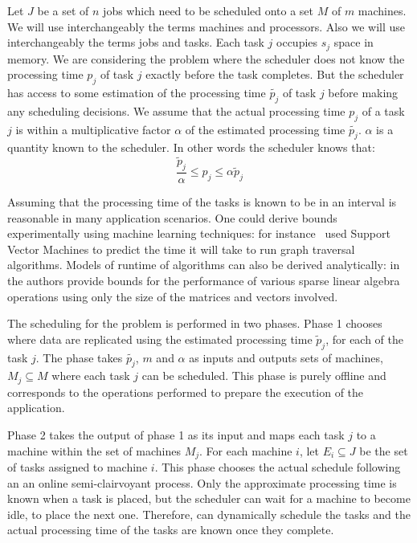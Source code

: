 \label{ch2}
\label{Intro}

 Let $J$ be a set of $n$ jobs which need to be scheduled onto a set $M$
 of $m$ machines.  We will use interchangeably the terms machines and
 processors. Also we will use interchangeably the terms jobs and
 tasks. Each task $j$ occupies $s_j$ space in memory.  We are considering the problem where the scheduler does not
 know the processing time $p_j$ of task $j$ exactly before the task
 completes.  But the scheduler has access to some estimation of the
 processing time $\tilde{p_j}$ of task $j$ before making any scheduling
 decisions. We assume that the actual processing time $p_j$ of a task
 $j$ is within a multiplicative factor $\alpha$ of the estimated
 processing time $\tilde{p_j}$. $\alpha$ is a quantity known to the
 scheduler. In other words the scheduler knows that:
  \begin{equation}\label{eq1}
 \frac{\tilde{p}_{j}}{\alpha}\leq p_{j}\leq \alpha \tilde{p}_{j}
 \end{equation}
 
 Assuming that the processing time of the tasks is known to be in an
 interval is reasonable in many application scenarios. One could derive
 bounds experimentally using machine learning techniques: for
 instance~\cite{You14-ICPP} used Support Vector Machines to predict the time it
 will take to run graph traversal algorithms. Models of runtime of
 algorithms can also be derived analytically:
 in~\cite{Erlebacher14-ICS} the authors provide bounds for the
 performance of various sparse linear algebra operations using only the
 size of the matrices and vectors involved.
 
 
 The scheduling for the problem is performed in two phases. Phase 1
 chooses where data are replicated using the estimated processing time
 $\tilde p_j $, for each of the task $j$. The phase takes
 $\tilde{p_j}$, $m$ and $\alpha$ as inputs and outputs sets of machines,
 $M_j \subseteq M $ where each task $j$ can be scheduled. This phase is
 purely offline and corresponds to the operations performed to prepare
 the execution of the application.
 
 Phase 2 takes the output of phase 1 as its input and maps each task $j$
 to a machine within the set of machines $M_j$. For each machine $i$,
 let $E_i \subseteq J$ be the set of tasks assigned to machine
 $i$. This phase chooses the actual schedule following an an online
 semi-clairvoyant process. Only the approximate processing time is
 known when a task is placed, but the scheduler can wait for a machine
 to become idle, to place the next one. Therefore, can dynamically
 schedule the tasks and the actual processing time of the tasks are
 known once they complete.
 

